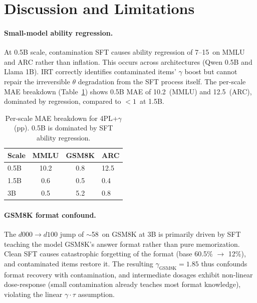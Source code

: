 \documentclass[11pt,a4paper]{article}
\newcommand{\pp}{\,\text{pp}}
\begin{document}
\section{Discussion and Limitations}
\label{sec:limitations}

\paragraph{Small-model ability regression.}
At 0.5B scale, contamination SFT causes ability regression of 7--15\pp{} on MMLU and ARC rather than inflation. This occurs across architectures (Qwen 0.5B and Llama 1B). IRT correctly identifies contaminated items' $\gamma$ boost but cannot repair the irreversible $\theta$ degradation from the SFT process itself. The per-scale MAE breakdown (Table~\ref{tab:per_scale}) shows 0.5B MAE of 10.2\pp{} (MMLU) and 12.5\pp{} (ARC), dominated by regression, compared to $<1$\pp{} at 1.5B.

\begin{table}[t]
\centering
\caption{Per-scale MAE breakdown for 4PL+$\gamma$ (pp). 0.5B is dominated by SFT ability regression.}
\label{tab:per_scale}
\small
\begin{tabular}{lccl}
\toprule
\textbf{Scale} & \textbf{MMLU} & \textbf{GSM8K} & \textbf{ARC} \\
\midrule
0.5B & 10.2 & 0.8  & 12.5 \\
1.5B & 0.6  & 0.5  & 0.4 \\
3B   & 0.5  & 5.2  & 0.8 \\
\bottomrule
\end{tabular}
\end{table}

\paragraph{GSM8K format confound.}
The $d000 \to d100$ jump of $\sim$58\pp{} on GSM8K at 3B is primarily driven by SFT teaching the model GSM8K's answer format rather than pure memorization. Clean SFT causes catastrophic forgetting of the format (base 60.5\% $\to$ 12\%), and contaminated items restore it. The resulting $\gamma_\text{GSM8K} = 1.85$ thus confounds format recovery with contamination, and intermediate dosages exhibit non-linear dose-response (small contamination already teaches most format knowledge), violating the linear $\gamma \cdot \tau$ assumption.
\end{document}
